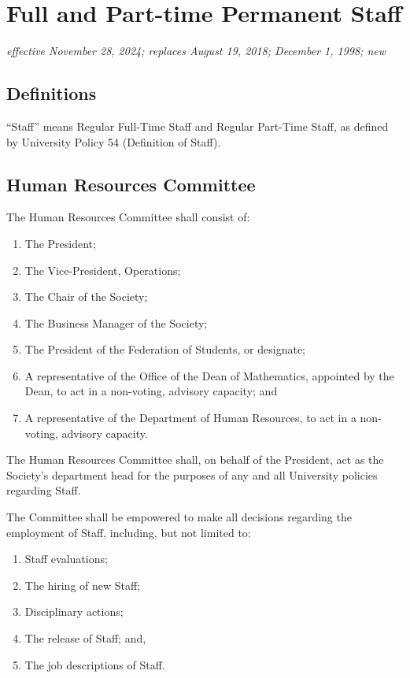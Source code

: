\section{Full and Part-time Permanent Staff}
\emph{effective November 28, 2024; replaces August 19, 2018; December 1, 1998; new}\\

\subsection{Definitions}
``Staff'' means Regular Full-Time Staff and Regular Part-Time Staff, as defined
by University Policy 54 (Definition of Staff).

\subsection{Human Resources Committee}
The Human Resources Committee shall consist of:
\begin{enumerate}
    \item The President;
    \item The Vice-President, Operations;
    \item The Chair of the Society;
    \item The Business Manager of the Society;
    \item The President of the Federation of 
        Students, or designate;
    \item A representative of the Office of the Dean of Mathematics, appointed
        by the Dean, to act in a non-voting, advisory capacity; and
    \item A representative of the Department of Human Resources, to act in a
        non-voting, advisory capacity.
\end{enumerate}

The Human Resources Committee shall, on behalf of the President, act as the
Society's department head for the purposes of any and all University policies
regarding Staff.

The Committee shall be empowered to make all decisions regarding the employment
of Staff, including, but not limited to:
\begin{enumerate}
    \item Staff evaluations;
    \item The hiring of new Staff;
    \item Disciplinary actions;
    \item The release of Staff; and,
    \item The job descriptions of Staff.
\end{enumerate}

